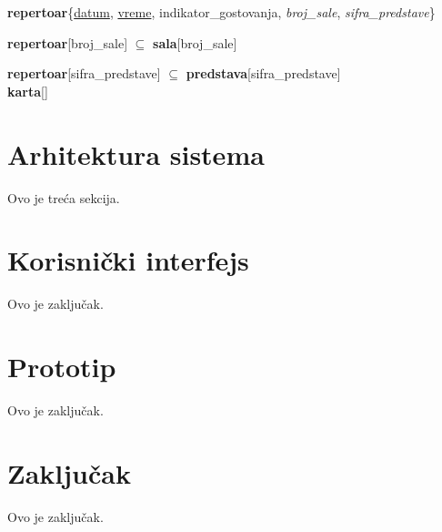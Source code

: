 \documentclass[a4paper]{article}
\begin{document}
\textbf{repertoar}\{\underline{datum}, \underline{vreme}, indikator\_gostovanja, 
  \textit{broj\_sale}, \textit{sifra\_predstave}\}

\textbf{repertoar}[broj\_sale] $\subseteq$ \textbf{sala}[broj\_sale]

\textbf{repertoar}[sifra\_predstave] $\subseteq$ \textbf{predstava}[sifra\_predstave]\\

\textbf{karta}[]


\section{Arhitektura sistema}
Ovo je treća sekcija.

\section{Korisnički interfejs}
Ovo je zaključak.

\section{Prototip}
Ovo je zaključak.

\section{Zaključak}
Ovo je zaključak.

\newpage

\appendix
 

\end{document}
